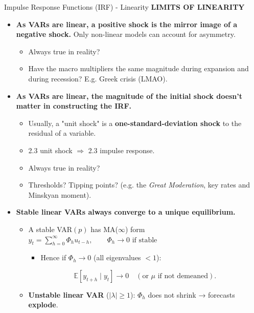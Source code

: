 \documentclass{beamer}
\begin{document}
\begin{frame}{Impulse Response Functions (IRF) - Linearity}
\textbf{LIMITS OF LINEARITY}
\scriptsize
\smallskip
\begin{itemize}
    \item \textbf{As VARs are linear, a positive shock is the mirror image of a negative shock. }Only non-linear models can account for asymmetry.
    \begin{itemize}
    \scriptsize
        \item Always true in reality? \pause
        \item  Have the macro multipliers the same magnitude during expansion and during recession? E.g. Greek crisis (LMAO).
    \end{itemize}
    \item \textbf{As VARs are linear, the magnitude of the initial shock doesn’t matter in constructing the IRF.}
    \begin{itemize}
    \scriptsize
        \item Usually, a "unit shock" is a \textbf{one-standard-deviation shock} to the residual of a variable.
        \item 2.3 unit shock $\Longrightarrow$ 2.3 impulse response. 
        \item Always true in reality? \pause
        \item Thresholds? Tipping points? (e.g. the \textit{Great Moderation}, key rates and Minskyan moment). 
    \end{itemize}
     \pause
    \item \textbf{Stable linear VARs always converge to a unique equilibrium.}
    \begin{itemize}
    \scriptsize
        \item A stable VAR$(p)$ has MA($\infty$) form $y_t = \sum_{h=0}^{\infty} \Phi_h u_{t-h},\qquad \Phi_h \to 0 \text{ if stable}$
    \begin{itemize}
    \scriptsize
\item Hence if $\Phi_h \to 0$ (all eigenvalues $<1$):
    \end{itemize}
\[
\mathbb{E}[y_{t+h}\mid y_t] \to 0 \quad
(\text{or }\mu \text{ if not demeaned}).
 \]
        \item \textbf{Unstable linear VAR} ($|\lambda|\ge1$): $\Phi_h$ does not shrink → forecasts \textbf{explode}.
    \end{itemize}
\end{itemize}

\end{frame}
\end{document}
